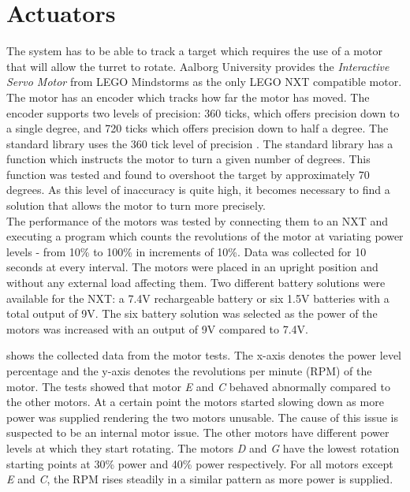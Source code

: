 \section{Actuators}\label{sec:actuators}\label{\automlabel}
The system has to be able to track a target which requires the use of a motor that will allow the turret to rotate. Aalborg University provides the \textit{Interactive Servo Motor} from LEGO Mindstorms as the only LEGO NXT compatible motor. The motor has an encoder which tracks how far the motor has moved. The encoder supports two levels of precision: 360 ticks, which offers precision down to a single degree, and 720 ticks which offers precision down to half a degree. The standard library uses the 360 tick level of precision \cite{NXTMOTOR}. The standard library  has a function which instructs the motor to turn a given number of degrees. This function was tested and found to overshoot the target by approximately 70 degrees. As this level of inaccuracy is quite high, it becomes necessary to find a solution that allows the motor to turn more precisely. \\

The performance of the motors was tested by connecting them to an NXT and executing a program which counts the revolutions of the motor at variating power levels - from 10\% to 100\% in increments of 10\%. Data was collected for 10 seconds at every interval. The motors were placed in an upright position and without any external load affecting them. Two different battery solutions were available for the NXT: a 7.4V rechargeable battery or six 1.5V batteries with a total output of 9V. The six battery solution was selected as the power of the motors was increased with an output of 9V compared to 7.4V.



 shows the collected data from the motor tests. The x-axis denotes the power level percentage and the y-axis denotes the revolutions per minute (RPM) of the motor. The tests showed that motor \emph{E} and \emph{C} behaved abnormally compared to the other motors. At a certain point the motors started slowing down as more power was supplied rendering the two motors unusable. The cause of this issue is suspected to be an internal motor issue. The other motors have different power levels at which they start rotating. The motors \emph{D} and \emph{G} have the lowest rotation starting points at 30\% power and 40\% power respectively. For all motors except \emph{E} and \emph{C}, the RPM rises steadily in a similar pattern as more power is supplied. 

